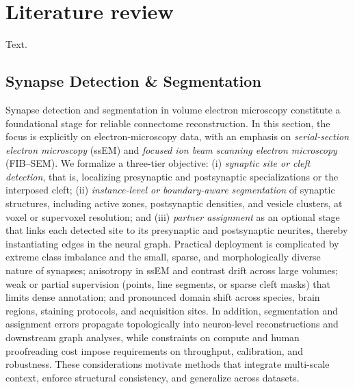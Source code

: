 \chapter{Literature review\label{cha:litreivew}}

Text.

\section{Synapse Detection \& Segmentation}

Synapse detection and segmentation in volume electron microscopy constitute a foundational stage for reliable connectome reconstruction. In this section, the focus is explicitly on electron‐microscopy data, with an emphasis on \emph{serial-section electron microscopy} (ssEM) and \emph{focused ion beam scanning electron microscopy} (FIB--SEM). We formalize a three-tier objective: (i) \emph{synaptic site or cleft detection}, that is, localizing presynaptic and postsynaptic specializations or the interposed cleft; (ii) \emph{instance-level or boundary-aware segmentation} of synaptic structures, including active zones, postsynaptic densities, and vesicle clusters, at voxel or supervoxel resolution; and (iii) \emph{partner assignment} as an optional stage that links each detected site to its presynaptic and postsynaptic neurites, thereby instantiating edges in the neural graph. Practical deployment is complicated by extreme class imbalance and the small, sparse, and morphologically diverse nature of synapses; anisotropy in ssEM and contrast drift across large volumes; weak or partial supervision (points, line segments, or sparse cleft masks) that limits dense annotation; and pronounced domain shift across species, brain regions, staining protocols, and acquisition sites. In addition, segmentation and assignment errors propagate topologically into neuron-level reconstructions and downstream graph analyses, while constraints on compute and human proofreading cost impose requirements on throughput, calibration, and robustness. These considerations motivate methods that integrate multi-scale context, enforce structural consistency, and generalize across datasets.


